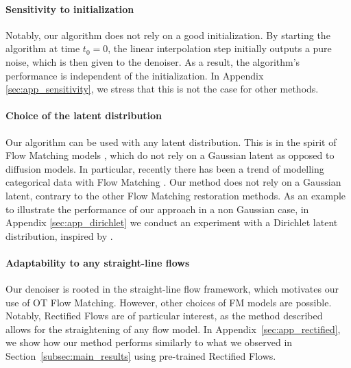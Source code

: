\documentclass{article} %
\theoremstyle{definition}
\begin{document}
\paragraph{Sensitivity to initialization} 
Notably, our algorithm does not rely on a good initialization. By starting the algorithm at time $t_0 = 0$, the linear interpolation step initially outputs a pure noise, which is then given to the denoiser. As a result, the algorithm's performance is independent of the initialization. In Appendix \ref{sec:app_sensitivity}, we stress that this is not the case for other methods.

\paragraph{Choice of the latent distribution} Our algorithm can be used with any latent distribution. This is in the spirit of Flow Matching models \citep{lipman2023flow}, which do not rely on a Gaussian latent as opposed to diffusion models. In particular, recently there has been a trend of modelling categorical data with Flow Matching \citep{boll2024, stark2024dirichlet, davis2024}. 
Our method does not rely on a Gaussian latent, contrary to the other Flow Matching restoration methods. As an example to illustrate the performance of our approach in a non Gaussian case, in Appendix \ref{sec:app_dirichlet} we conduct an experiment with a Dirichlet latent distribution, inspired by \citep{stark2024dirichlet}.

\paragraph{Adaptability to any straight-line flows} Our denoiser is rooted in the straight-line flow framework, which motivates our use of OT Flow Matching. However, other choices of FM models are possible. Notably, Rectified Flows \citep{liu2023flow} are of particular interest, as the method described allows for the straightening of any flow model. In Appendix~\ref{sec:app_rectified}, we show how our method performs similarly to what we observed in Section~\ref{subsec:main_results} using pre-trained Rectified Flows.
\end{document}
